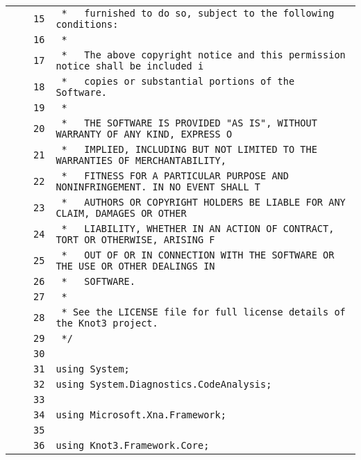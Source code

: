 \documentclass[a4paper,10pt]{article}
\begin{document}
\begin{longtable}[l]{lrrl}
\cellcolor{gray} &  & \verb~15~ & \verb~ *   furnished to do so, subject to the following conditions:~\\
\cellcolor{gray} &  & \verb~16~ & \verb~ *~\\
\cellcolor{gray} &  & \verb~17~ & \verb~ *   The above copyright notice and this permission notice shall be included i~\\
\cellcolor{gray} &  & \verb~18~ & \verb~ *   copies or substantial portions of the Software.~\\
\cellcolor{gray} &  & \verb~19~ & \verb~ *~\\
\cellcolor{gray} &  & \verb~20~ & \verb~ *   THE SOFTWARE IS PROVIDED "AS IS", WITHOUT WARRANTY OF ANY KIND, EXPRESS O~\\
\cellcolor{gray} &  & \verb~21~ & \verb~ *   IMPLIED, INCLUDING BUT NOT LIMITED TO THE WARRANTIES OF MERCHANTABILITY,~\\
\cellcolor{gray} &  & \verb~22~ & \verb~ *   FITNESS FOR A PARTICULAR PURPOSE AND NONINFRINGEMENT. IN NO EVENT SHALL T~\\
\cellcolor{gray} &  & \verb~23~ & \verb~ *   AUTHORS OR COPYRIGHT HOLDERS BE LIABLE FOR ANY CLAIM, DAMAGES OR OTHER~\\
\cellcolor{gray} &  & \verb~24~ & \verb~ *   LIABILITY, WHETHER IN AN ACTION OF CONTRACT, TORT OR OTHERWISE, ARISING F~\\
\cellcolor{gray} &  & \verb~25~ & \verb~ *   OUT OF OR IN CONNECTION WITH THE SOFTWARE OR THE USE OR OTHER DEALINGS IN~\\
\cellcolor{gray} &  & \verb~26~ & \verb~ *   SOFTWARE.~\\
\cellcolor{gray} &  & \verb~27~ & \verb~ *~\\
\cellcolor{gray} &  & \verb~28~ & \verb~ * See the LICENSE file for full license details of the Knot3 project.~\\
\cellcolor{gray} &  & \verb~29~ & \verb~ */~\\
\cellcolor{gray} &  & \verb~30~ & \verb~~\\
\cellcolor{gray} &  & \verb~31~ & \verb~using System;~\\
\cellcolor{gray} &  & \verb~32~ & \verb~using System.Diagnostics.CodeAnalysis;~\\
\cellcolor{gray} &  & \verb~33~ & \verb~~\\
\cellcolor{gray} &  & \verb~34~ & \verb~using Microsoft.Xna.Framework;~\\
\cellcolor{gray} &  & \verb~35~ & \verb~~\\
\cellcolor{gray} &  & \verb~36~ & \verb~using Knot3.Framework.Core;~\\

\end{longtable}
\end{document}
